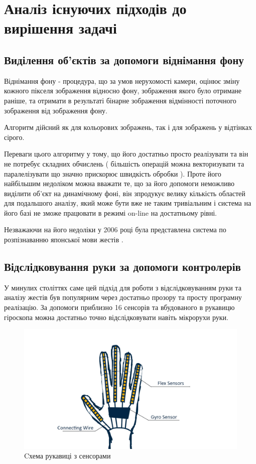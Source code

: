 \section{Аналіз існуючих підходів до вирішення задачі}
\subsection{Виділення об'єктів за допомоги віднімання фону}
Віднімання фону - процедура, що за умов нерухомості камери, оцінює зміну кожного пікселя зображення відносно фону, зображення якого було отримане раніше, та отримати в результаті бінарне зображення відмінності поточного зображення від зображення фону.

Алгоритм дійсний як для кольорових зображень, так і для зображень у відтінках сірого.

Переваги цього алгоритму у тому, що його достатньо просто реалізувати та він не потребує складних обчислень ( більшість операцій можна векторизувати та паралелізувати що значно прискорює швидкість обробки ). Проте його найбільшим недоліком можна вважати те, що за його допомоги неможливо виділити об'єкт на динамічному фоні, він зпродукує велику кількість областей для подальшого аналізу, який може бути вже не таким тривіальним і система на його базі не зможе працювати в режимі on-line на достатньому рівні.

Незважаючи на його недоліки у 2006 році була представлена система по розпізнаванню японської мови жестів \cite{BackgroundSubtraction}.

\subsection{Відслідковування руки за допомоги контролерів}

У минулих століттях саме цей підхід для роботи з відслідковуванням руки та аналізу жестів був популярним через достатньо прозору та просту програмну реалізацію. За допомоги приблизно 16 сенсорів та вбудованого в рукавицю гіроскопа можна достатньо точно відслідковувати навіть мікрорухи руки.

\begin{figure}[H]
	\includegraphics[width=0.9\linewidth]{task_analysis/img/wired_glove}
	\caption{Cхема рукавиці з сенсорами}
\end{figure}

